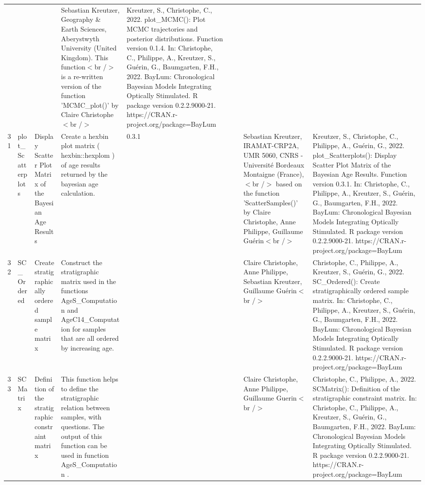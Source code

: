 \begin{table}[ht]
\begin{tabular}{rllllllll}
 &  &  & Sebastian Kreutzer, Geography \& Earth Sciences, Aberystwyth University (United Kingdom). This function$<$br /$>$ is a re-written version of the function 'MCMC\_plot()' by Claire Christophe$<$br /$>$ & Kreutzer, S., Christophe, C., 2022. plot\_MCMC(): Plot MCMC trajectories and posterior distributions. Function version 0.1.4. In: Christophe, C., Philippe, A., Kreutzer, S., Guérin, G., Baumgarten, F.H., 2022. BayLum: Chronological Bayesian Models Integrating Optically Stimulated. R package version 0.2.2.9000-21. https://CRAN.r-project.org/package=BayLum
 \\ 
  31 & plot\_Scatterplots & Display Scatter Plot Matrix of the Bayesian Age Results & Create a hexbin plot matrix ( hexbin::hexplom ) of age results returned by the bayesian age calculation. & 0.3.1
 &  &  & Sebastian Kreutzer, IRAMAT-CRP2A, UMR 5060, CNRS - Université Bordeaux Montaigne (France),$<$br /$>$ based on the function 'ScatterSamples()' by Claire Christophe, Anne Philippe, Guillaume Guérin$<$br /$>$ & Kreutzer, S., Christophe, C., Philippe, A., Guérin, G., 2022. plot\_Scatterplots(): Display Scatter Plot Matrix of the Bayesian Age Results. Function version 0.3.1. In: Christophe, C., Philippe, A., Kreutzer, S., Guérin, G., Baumgarten, F.H., 2022. BayLum: Chronological Bayesian Models Integrating Optically Stimulated. R package version 0.2.2.9000-21. https://CRAN.r-project.org/package=BayLum
 \\ 
  32 & SC\_Ordered & Create stratigraphically ordered sample matrix & Construct the stratigraphic matrix used in the functions  AgeS\_Computation  and  AgeC14\_Computation  for samples that are all ordered by increasing age. &  &  &  & Claire Christophe, Anne Philippe, Sebastian Kreutzer, Guillaume Guérin$<$br /$>$ & Christophe, C., Philippe, A., Kreutzer, S., Guérin, G., 2022. SC\_Ordered(): Create stratigraphically ordered sample matrix. In: Christophe, C., Philippe, A., Kreutzer, S., Guérin, G., Baumgarten, F.H., 2022. BayLum: Chronological Bayesian Models Integrating Optically Stimulated. R package version 0.2.2.9000-21. https://CRAN.r-project.org/package=BayLum
 \\ 
  33 & SCMatrix & Definition of the stratigraphic constraint matrix & This function helps to define the stratigraphic relation between samples, with questions. The output of this function can be used in function  AgeS\_Computation . &  &  &  & Claire Christophe, Anne Philippe, Guillaume Guerin$<$br /$>$ & Christophe, C., Philippe, A., 2022. SCMatrix(): Definition of the stratigraphic constraint matrix. In: Christophe, C., Philippe, A., Kreutzer, S., Guérin, G., Baumgarten, F.H., 2022. BayLum: Chronological Bayesian Models Integrating Optically Stimulated. R package version 0.2.2.9000-21. https://CRAN.r-project.org/package=BayLum

\end{tabular}
\end{table}
